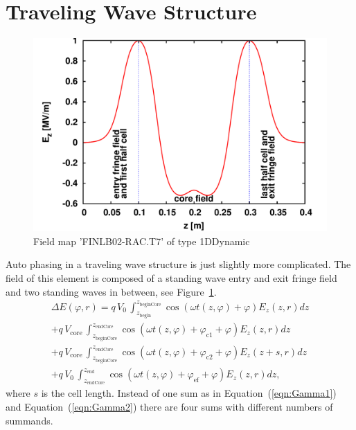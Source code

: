 \documentclass[automark,a4paper,11pt,headsepline]{scrartcl}
\begin{document}
\section{Traveling Wave Structure}
\begin{figure} 
\includegraphics[angle=0,width=0.9\linewidth]{field_crop}
\caption{Field map 'FINLB02-RAC.T7' of type 1DDynamic}
\label{tws}
\end{figure}
Auto phasing in a traveling wave structure is just slightly more complicated. The field of this element is composed of a standing wave entry and exit fringe field and two standing waves in between, see Figure~\ref{tws}.
\begin{multline}
\Delta E(\varphi,r) = q\, V_{0}\,\int_{z_\text{begin}}^{z_\text{beginCore}} \cos(\omega t(z,\varphi) + \varphi) E_z(z, r) dz \\
+ q\, V_\text{core}\,\int_{z_\text{beginCore}}^{z_\text{endCore}} \cos(\omega t(z,\varphi) + \varphi_\text{c1} + \varphi) E_z(z, r) dz \\
+ q\, V_\text{core}\,\int_{z_\text{beginCore}}^{z_\text{endCore}} \cos(\omega t(z,\varphi) + \varphi_\text{c2} + \varphi) E_z(z + s, r) dz \\
+ q\, V_{0}\,\int_{z_\text{endCore}}^{z_\text{end}} \cos(\omega t(z,\varphi) + \varphi_\text{ef} + \varphi) E_z(z, r) dz,
\end{multline}
where $s$ is the cell length. Instead of one sum as in Equation~(\ref{eqn:Gamma1}) and Equation~(\ref{eqn:Gamma2}) there are four sums with different numbers of summands.
\end{document}
